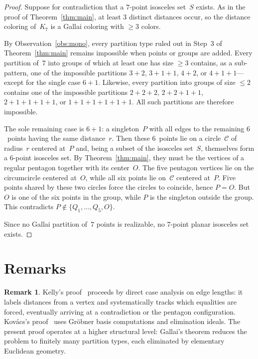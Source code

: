 \documentclass[12pt]{amsart}
\theoremstyle{definition}
\newtheorem{remark}[theorem]{Remark}
\begin{document}
\begin{proof}
Suppose for contradiction that a $7$-point isosceles set~$S$ exists. As in the proof of Theorem~\ref{thm:main}, at least $3$ distinct distances occur, so the distance coloring of~$K_7$ is a Gallai coloring with $\geq 3$ colors.

By Observation~\ref{obs:mono}, every partition type ruled out in Step~3 of Theorem~\ref{thm:main} remains impossible when points or groups are added. Every partition of~$7$ into groups of which at least one has size $\geq 3$ contains, as a sub-pattern, one of the impossible partitions $3{+}2$, $3{+}1{+}1$, $4{+}2$, or $4{+}1{+}1$---except for the single case $6{+}1$. Likewise, every partition into groups of size $\leq 2$ contains one of the impossible partitions $2{+}2{+}2$, $2{+}2{+}1{+}1$, $2{+}1{+}1{+}1{+}1$, or $1{+}1{+}1{+}1{+}1{+}1$. All such partitions are therefore impossible.

The sole remaining case is $6{+}1$: a singleton~$P$ with all edges to the remaining $6$~points having the same distance~$r$. Then these $6$~points lie on a circle~$\mathcal{C}$ of radius~$r$ centered at~$P$ and, being a subset of the isosceles set~$S$, themselves form a $6$-point isosceles set. By Theorem~\ref{thm:main}, they must be the vertices of a regular pentagon together with its center~$O$. The five pentagon vertices lie on the circumcircle centered at~$O$, while all six points lie on~$\mathcal{C}$ centered at~$P$. Five points shared by these two circles force the circles to coincide, hence $P = O$. But $O$ is one of the six points in the group, while $P$ is the singleton outside the group. This contradicts $P \notin \{Q_1, \ldots, Q_5, O\}$.

Since no Gallai partition of~$7$ points is realizable, no $7$-point planar isosceles set exists.
\end{proof}

\section{Remarks}

\begin{remark}
Kelly's proof~\cite{ErKe47} proceeds by direct case analysis on edge lengths: it labels distances from a vertex and systematically tracks which equalities are forced, eventually arriving at a contradiction or the pentagon configuration. Kov\'acs's proof~\cite{Ko24} uses Gr\"obner basis computations and elimination ideals. The present proof operates at a higher structural level: Gallai's theorem reduces the problem to finitely many partition types, each eliminated by elementary Euclidean geometry.
\end{remark}
\end{document}
